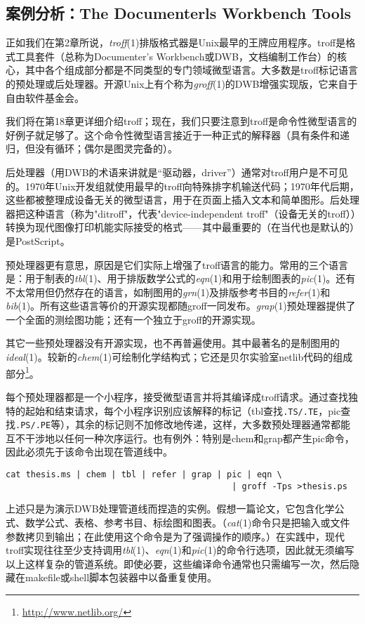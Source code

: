 \documentclass[12pt,oneside]{ctexbook}
\begin{document}
\begin{common-format}
\subsection{案例分析：The Documenterls Workbench Tools}
正如我们在第2章所说，\textit{troff}(1)排版格式器是Unix最早的王牌应用程序。troff是格式工具套件（总称为Documenter's Workbench或DWB，文档编制工作台）的核心，其中各个组成部分都是不同类型的专门领域微型语言。大多数是troff标记语言的预处理或后处理器。开源Unix上有个称为\textit{groff}(1)的DWB增强实现版，它来自于自由软件基金会。

我们将在第18章更详细介绍troff；现在，我们只要注意到troff是命令性微型语言的好例子就足够了。这个命令性微型语言接近于一种正式的解释器（具有条件和递归，但没有循环；偶尔是图灵完备的）。

后处理器（用DWB的术语来讲就是“驱动器，driver”）通常对troff用户是不可见的。1970年Unix开发组就使用最早的troff向特殊排字机输送代码；1970年代后期，这些都被整理成设备无关的微型语言，用于在页面上插入文本和简单图形。后处理器把这种语言（称为"ditroff"，代表"device-independent troff"（设备无关的troff））转换为现代图像打印机能实际接受的格式——其中最重要的（在当代也是默认的）是PostScript。

预处理器更有意思，原因是它们实际上增强了troff语言的能力。常用的三个语言是：用于制表的\textit{tbl}(1)、用于排版数学公式的\textit{eqn}(1)和用于绘制图表的\textit{pic}(1)。还有不太常用但仍然存在的语言，如制图用的\textit{grn}(1)及排版参考书目的\textit{refer}(1)和\textit{bib}(1)。所有这些语言等价的开源实现都随groff一同发布。\textit{grap}(1)预处理器提供了一个全面的测绘图功能；还有一个独立于groff的开源实现。

其它一些预处理器没有开源实现，也不再普遍使用。其中最著名的是制图用的\textit{ideal}(1)。较新的\textit{chem}(1)可绘制化学结构式；它还是贝尔实验室netlib代码的组成部分\footnote{\href{http://www.netlib.org/}{http://www.netlib.org/}}。

每个预处理器都是一个小程序，接受微型语言并将其编译成troff请求。通过查找独特的起始和结束请求，每个小程序识别应该解释的标记（tbl查找\verb+.TS/.TE+，pic查找\verb+.PS/.PE+等），其余的标记则不加修改地传递，这样，大多数预处理器通常都能互不干涉地以任何一种次序运行。也有例外：特别是chem和grap都产生pic命令，因此必须先于该命令出现在管道线中。

\begin{Verbatim}
cat thesis.ms | chem | tbl | refer | grap | pic | eqn \
                                             | groff -Tps >thesis.ps
\end{Verbatim}

上述只是为演示DWB处理管道线而捏造的实例。假想一篇论文，它包含化学公式、数学公式、表格、参考书目、标绘图和图表。（\textit{cat}(1)命令只是把输入或文件参数拷贝到输出；在此使用这个命令是为了强调操作的顺序。）在实践中，现代troff实现往往至少支持调用\textit{tbl}(1)、\textit{eqn}(1)和\textit{pic}(1)的命令行选项，因此就无须编写以上这样复杂的管道系统。即使必要，这些编译命令通常也只需编写一次，然后隐藏在makefile或shell脚本包装器中以备重复使用。


\end{common-format}
\end{document}
